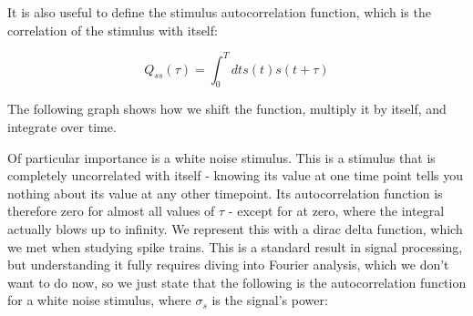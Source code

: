 \documentclass{article}
\begin{document}
It is also useful to define the stimulus autocorrelation function, which is the correlation of the stimulus with itself:

\begin{equation*}
	Q_{ss}(\tau) = \int_0^T dt s(t) s(t+\tau)
\end{equation*}

The following graph shows how we shift the function, multiply it by itself, and integrate over time.\\

\begin{figure}[H]
	\centering

\end{figure}

Of particular importance is a white noise stimulus. This is a stimulus that is completely uncorrelated with itself - knowing its value at one time point tells you nothing about its value at any other timepoint. Its autocorrelation function is therefore zero for almost all values of $\tau$ - except for at zero, where the integral actually blows up to infinity. We represent this with a dirac delta function, which we met when studying spike trains. This is a standard result in signal processing, but understanding it fully requires diving into Fourier analysis, which we don't want to do now, so we just state that the following is the autocorrelation function for a white noise stimulus, where $\sigma_s$ is the signal's power:
\end{document}
